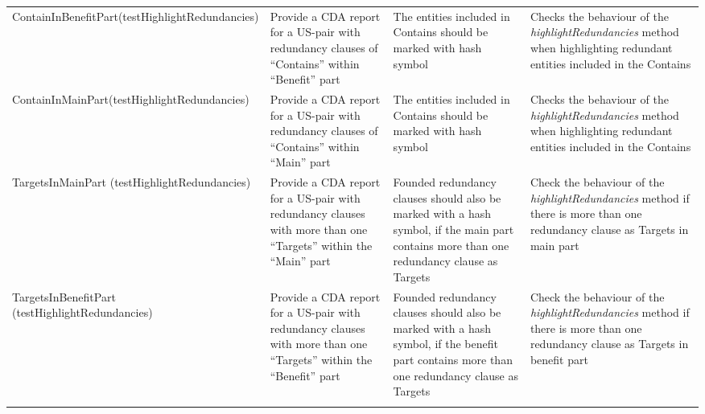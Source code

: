 \begin{tabularx}{\textwidth}{X  X  X  X}
			ContainInBenefitPart\newline(testHighlightRedundancies)&Provide a CDA report for a US-pair with redundancy clauses of \enquote{Contains} within \enquote{Benefit} part&The entities included in Contains should be marked with hash symbol&Checks the behaviour of the \textit{highlightRedundancies} method when highlighting redundant entities included in the Contains\\
			
			ContainInMainPart\newline(testHighlightRedundancies)&Provide a CDA report for a US-pair with redundancy clauses of \enquote{Contains} within \enquote{Main} part&The entities included in Contains should be marked with hash symbol&Checks the behaviour of the \textit{highlightRedundancies} method when highlighting redundant entities included in the Contains\\
			
			TargetsInMainPart \newline(testHighlightRedundancies)&Provide a CDA report for a US-pair with redundancy clauses with more than one \enquote{Targets} within the \enquote{Main} part&Founded redundancy clauses should also be marked with a hash symbol, if the main part contains more than one redundancy clause as Targets&Check the behaviour of the \textit{highlightRedundancies} method if there is more than one redundancy clause as Targets in main part\\
			
			TargetsInBenefitPart \newline(testHighlightRedundancies)&Provide a CDA report for a US-pair with redundancy clauses with more than one \enquote{Targets} within the \enquote{Benefit} part&Founded redundancy clauses should also be marked with a hash symbol, if the benefit part contains more than one redundancy clause as Targets&Check the behaviour of the \textit{highlightRedundancies} method if there is more than one redundancy clause as Targets in benefit part\\
			
			
			\hline
				\caption{Test cases for ReportExtractor  class}\label{tb:test_cases_report_extractor}
		\end{tabularx}		
		\endgroup
\thispagestyle{empty}

\thispagestyle{empty}
\begingroup
\centering
\scriptsize
\renewcommand{\arraystretch}{1,5} 
\keepXColumns

